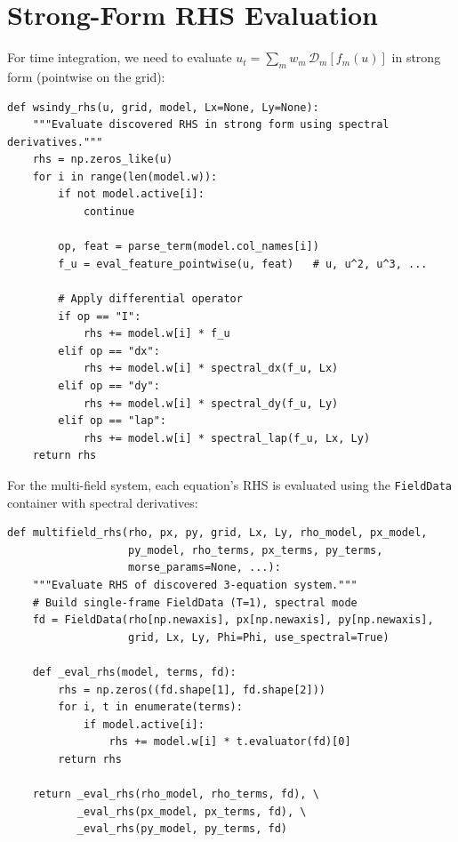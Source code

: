 \documentclass[11pt]{article}
\begin{document}
\section{Strong-Form RHS Evaluation}
\label{sec:rhs}

For time integration, we need to evaluate $u_t = \sum_m w_m\,\mathcal{D}_m[f_m(u)]$
in strong form (pointwise on the grid):

\begin{lstlisting}[caption={rhs.py --- wsindy\_rhs}]
def wsindy_rhs(u, grid, model, Lx=None, Ly=None):
    """Evaluate discovered RHS in strong form using spectral derivatives."""
    rhs = np.zeros_like(u)
    for i in range(len(model.w)):
        if not model.active[i]:
            continue

        op, feat = parse_term(model.col_names[i])
        f_u = eval_feature_pointwise(u, feat)   # u, u^2, u^3, ...

        # Apply differential operator
        if op == "I":
            rhs += model.w[i] * f_u
        elif op == "dx":
            rhs += model.w[i] * spectral_dx(f_u, Lx)
        elif op == "dy":
            rhs += model.w[i] * spectral_dy(f_u, Ly)
        elif op == "lap":
            rhs += model.w[i] * spectral_lap(f_u, Lx, Ly)
    return rhs
\end{lstlisting}

For the multi-field system, each equation's RHS is evaluated using the
\texttt{FieldData} container with spectral derivatives:

\begin{lstlisting}[caption={multifield.py --- multifield\_rhs}]
def multifield_rhs(rho, px, py, grid, Lx, Ly, rho_model, px_model,
                   py_model, rho_terms, px_terms, py_terms,
                   morse_params=None, ...):
    """Evaluate RHS of discovered 3-equation system."""
    # Build single-frame FieldData (T=1), spectral mode
    fd = FieldData(rho[np.newaxis], px[np.newaxis], py[np.newaxis],
                   grid, Lx, Ly, Phi=Phi, use_spectral=True)

    def _eval_rhs(model, terms, fd):
        rhs = np.zeros((fd.shape[1], fd.shape[2]))
        for i, t in enumerate(terms):
            if model.active[i]:
                rhs += model.w[i] * t.evaluator(fd)[0]
        return rhs

    return _eval_rhs(rho_model, rho_terms, fd), \
           _eval_rhs(px_model, px_terms, fd), \
           _eval_rhs(py_model, py_terms, fd)
\end{lstlisting}
\end{document}
